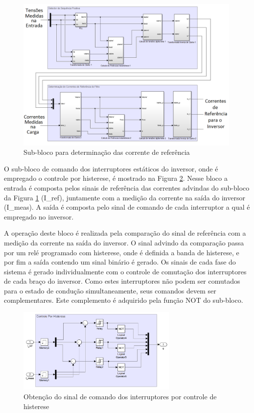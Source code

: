\begin{figure}[!htb] %
	\centering
	\includegraphics[width=0.99\textwidth]{Cap4/Figuras/controlador.png}
	\caption{Sub-bloco para determinação das corrente de referência}
	\label{fig:controladador.png}
\end{figure}

O sub-bloco de comando dos interruptores estáticos do inversor, onde é empregado o controle por histerese, é mostrado na Figura \ref{fig:histerese_sim.png}. Nesse bloco a entrada é composta pelos sinais de referência das correntes advindas do sub-bloco da Figura \ref{fig:controladador.png} (I\_ref), juntamente com a medição da corrente na saída do inversor (I\_meas). A saída é composta pelo sinal de comando de cada interruptor a qual é empregado no inversor.

A operação deste bloco é realizada pela comparação do sinal de referência com a medição da corrente na saída do inversor. O sinal advindo da comparação passa por um relé programado com histerese, onde é definida a banda de histerese, e por fim a saída contendo um sinal binário é gerado. Os sinais de cada fase do sistema é gerado individualmente com o controle de comutação dos interruptores de cada braço do inversor. Como estes interruptores não podem ser comutados para o estado de condução simultaneamente, seus comandos devem ser complementares. Este complemento é adquirido pela função NOT do sub-bloco.

\begin{figure}[!htb] %
	\centering
	\includegraphics[width=0.7\textwidth]{Cap4/Figuras/histerese_sim.png}
	\caption{Obtenção do sinal de comando dos interruptores por controle de histerese}
	\label{fig:histerese_sim.png}
\end{figure}

